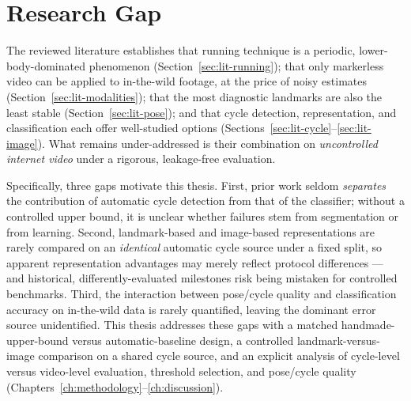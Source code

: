 \section{Research Gap}
\label{sec:lit-gap}

The reviewed literature establishes that running technique is a periodic,
lower-body-dominated phenomenon (Section~\ref{sec:lit-running}); that only
markerless video can be applied to in-the-wild footage, at the price of noisy
estimates (Section~\ref{sec:lit-modalities}); that the most diagnostic landmarks
are also the least stable (Section~\ref{sec:lit-pose}); and that cycle detection,
representation, and classification each offer well-studied options
(Sections~\ref{sec:lit-cycle}--\ref{sec:lit-image}). What remains
under-addressed is their combination on \emph{uncontrolled internet video} under
a rigorous, leakage-free evaluation.

Specifically, three gaps motivate this thesis. First, prior work seldom
\emph{separates} the contribution of automatic cycle detection from that of the
classifier; without a controlled upper bound, it is unclear whether failures
stem from segmentation or from learning. Second, landmark-based and image-based
representations are rarely compared on an \emph{identical} automatic cycle source
under a fixed split, so apparent representation advantages may merely reflect
protocol differences --- and historical, differently-evaluated milestones risk
being mistaken for controlled benchmarks. Third, the interaction between
pose/cycle quality and classification accuracy on in-the-wild data is rarely
quantified, leaving the dominant error source unidentified. This thesis addresses
these gaps with a matched handmade-upper-bound versus automatic-baseline design,
a controlled landmark-versus-image comparison on a shared cycle source, and an
explicit analysis of cycle-level versus video-level evaluation, threshold
selection, and pose/cycle quality
(Chapters~\ref{ch:methodology}--\ref{ch:discussion}).

